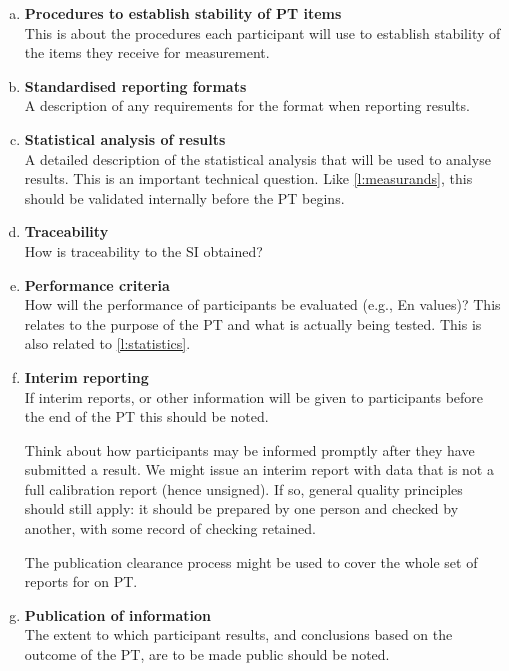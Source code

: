 \begin{enumerate}[a)]
\item	\textbf{Procedures to establish stability of PT items} \\ \label{l:stability}%
This is about the procedures each participant will use to establish stability of the items they receive for measurement.

\item	\textbf{Standardised reporting formats} \\
A description of any requirements for the format when reporting results. 

\item	\textbf{Statistical analysis of results} \\ \label{l:statistics}%
A detailed description of the statistical analysis that will be used to analyse results.
This is an important technical question. Like \ref{l:measurands}, this should be validated internally before the PT begins.

\item	\textbf{Traceability} \\
How is traceability to the SI obtained?

\item	\textbf{Performance criteria} \\
How will the performance of participants be evaluated (e.g., En values)? This relates to the purpose of the PT and what is actually being tested. This is also related to \ref{l:statistics}. 


\item	\textbf{Interim reporting} \\
If interim reports, or other information will be given to participants before the end of the PT this should be noted. 

Think about how participants may be informed promptly after they have submitted a result. We might issue an interim report with data that is not a full calibration report (hence unsigned). If so, general quality principles should still apply: it should be prepared by one person and checked by another, with some record of checking retained. 

The publication clearance process might be used to cover the whole set of reports for on PT. 

\item	\textbf{Publication of information} \\
The extent to which participant results, and conclusions based on the outcome of the PT, are to be made public should be noted. 


\end{enumerate}
